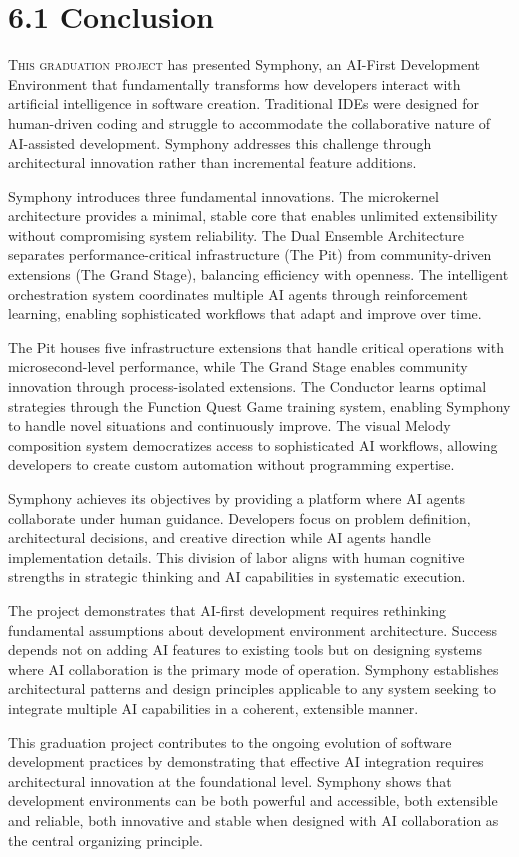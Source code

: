 
\section{6.1 Conclusion}
\label{sec:conclusion}
\setcounter{subsection}{0}

\lettrine{T}{his graduation project} has presented Symphony, an AI-First Development Environment that fundamentally transforms how developers interact with artificial intelligence in software creation. Traditional IDEs were designed for human-driven coding and struggle to accommodate the collaborative nature of AI-assisted development. Symphony addresses this challenge through architectural innovation rather than incremental feature additions.

Symphony introduces three fundamental innovations. The microkernel architecture provides a minimal, stable core that enables unlimited extensibility without compromising system reliability. The Dual Ensemble Architecture separates performance-critical infrastructure (The Pit) from community-driven extensions (The Grand Stage), balancing efficiency with openness. The intelligent orchestration system coordinates multiple AI agents through reinforcement learning, enabling sophisticated workflows that adapt and improve over time.

The Pit houses five infrastructure extensions that handle critical operations with microsecond-level performance, while The Grand Stage enables community innovation through process-isolated extensions. The Conductor learns optimal strategies through the Function Quest Game training system, enabling Symphony to handle novel situations and continuously improve. The visual Melody composition system democratizes access to sophisticated AI workflows, allowing developers to create custom automation without programming expertise.

Symphony achieves its objectives by providing a platform where AI agents collaborate under human guidance. Developers focus on problem definition, architectural decisions, and creative direction while AI agents handle implementation details. This division of labor aligns with human cognitive strengths in strategic thinking and AI capabilities in systematic execution.

The project demonstrates that AI-first development requires rethinking fundamental assumptions about development environment architecture. Success depends not on adding AI features to existing tools but on designing systems where AI collaboration is the primary mode of operation. Symphony establishes architectural patterns and design principles applicable to any system seeking to integrate multiple AI capabilities in a coherent, extensible manner.

This graduation project contributes to the ongoing evolution of software development practices by demonstrating that effective AI integration requires architectural innovation at the foundational level. Symphony shows that development environments can be both powerful and accessible, both extensible and reliable, both innovative and stable when designed with AI collaboration as the central organizing principle.
